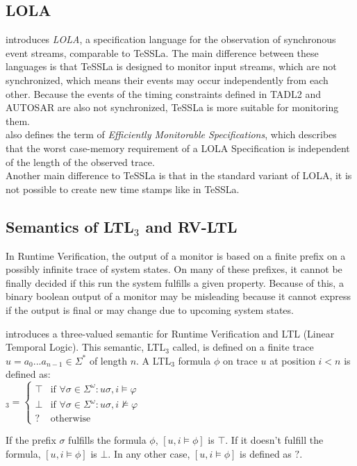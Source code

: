 	\subsection{LOLA\cite{LOLA}}
		\cite{LOLA} introduces \textit{LOLA}, a specification language for the observation of synchronous event streams, comparable to TeSSLa. The main difference between these languages is that TeSSLa is designed to monitor input streams, which are not synchronized, which means their events may occur independently from each other. Because the events of the timing constraints defined in TADL2 and AUTOSAR are also not synchronized, TeSSLa is more suitable for monitoring them.\\
		\cite{LOLA} also defines the term of \textit{Efficiently Monitorable Specifications}, which describes that the worst case-memory requirement of a LOLA Specification is independent of the length of the observed trace.\\
		Another main difference to TeSSLa is that in the standard variant of LOLA, it is not possible to create new time stamps like in TeSSLa.
		
	\subsection{Semantics of LTL$_3$\cite{1157} and RV-LTL\cite{10.1007/978-3-540-77395-5_11}}
		In Runtime Verification, the output of a monitor is based on a finite prefix on a possibly infinite trace of system states. On many of these prefixes, it cannot be finally decided if this run the system fulfills a given property.  Because of this, a binary boolean output of a monitor may be misleading because it cannot express if the output is final or may change due to upcoming system states.
		\begin{definition}
		\cite{1157} introduces a three-valued semantic for Runtime Verification and LTL (Linear Temporal Logic). This semantic, LTL$_3$ called, is defined on a finite trace $u=a_0...a_{n-1}\in\Sigma^*$ of length $n$. A LTL$_3$ formula $\phi$ on trace $u$ at position $i < n$ is defined as:\\
			\begin{math}
				[u,i\models\varphi]_3=
					\begin{cases}
						\top & \text{if } \forall \sigma\in\Sigma^\omega:u\sigma,i \vDash\varphi\\
						\bot & \text{if } \forall \sigma\in\Sigma^\omega:u\sigma,i \nvDash\varphi\\
						? & \text{otherwise }
					\end{cases}
			\end{math}
		\end{definition}
		If the prefix $\sigma$ fulfills the formula $\phi$, $[u,i\models\phi]$ is $\top$. If it doesn't fulfill the formula, $[u,i\models\phi]$ is $\bot$. In any other case, $[u,i\models\phi]$  is defined as $?$.\\ \\
		
